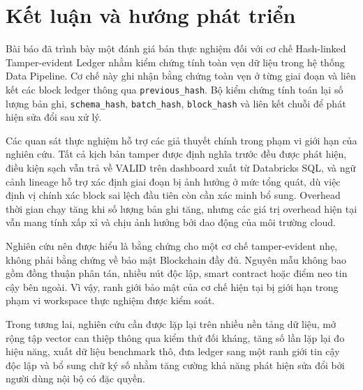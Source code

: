\section{Kết luận và hướng phát
triển}\label{sec:extra0}

Bài báo đã trình bày một đánh giá bán thực nghiệm đối với cơ chế
Hash-linked Tamper-evident Ledger nhằm kiểm chứng tính toàn vẹn dữ liệu
trong hệ thống Data Pipeline. Cơ chế này ghi nhận bằng chứng toàn vẹn ở
từng giai đoạn và liên kết các block ledger thông qua
\texttt{previous\_hash}. Bộ kiểm chứng tính toán lại số lượng bản ghi,
\texttt{schema\_hash}, \texttt{batch\_hash}, \texttt{block\_hash} và
liên kết chuỗi để phát hiện sửa đổi sau xử lý.

Các quan sát thực nghiệm hỗ trợ các giả thuyết chính trong phạm vi giới
hạn của nghiên cứu. Tất cả kịch bản tamper được định nghĩa trước đều
được phát hiện, điều kiện sạch vẫn trả về VALID trên dashboard xuất từ
Databricks SQL, và ngữ cảnh lineage hỗ trợ xác định giai đoạn bị ảnh
hưởng ở mức tổng quát, dù việc định vị chính xác block sai lệch đầu tiên
còn cần xác minh bổ sung. Overhead thời gian chạy tăng khi số lượng bản
ghi tăng, nhưng các giá trị overhead hiện tại vẫn mang tính xấp xỉ và
chịu ảnh hưởng bởi dao động của môi trường cloud.

Nghiên cứu nên được hiểu là bằng chứng cho một cơ chế tamper-evident
nhẹ, không phải bằng chứng về bảo mật Blockchain đầy đủ. Nguyên mẫu
không bao gồm đồng thuận phân tán, nhiều nút độc lập, smart contract
hoặc điểm neo tin cậy bên ngoài. Vì vậy, ranh giới bảo mật của cơ chế
hiện tại bị giới hạn trong phạm vi workspace thực nghiệm được kiểm soát.

Trong tương lai, nghiên cứu cần được lặp lại trên nhiều nền tảng dữ liệu,
mở rộng tập vector can thiệp thông qua kiểm thử đối kháng, tăng số lần lặp
lại đo hiệu năng, xuất dữ liệu benchmark thô, đưa ledger sang một ranh
giới tin cậy độc lập và bổ sung chữ ký số nhằm tăng cường khả năng phát
hiện sửa đổi bởi người dùng nội bộ có đặc quyền.
